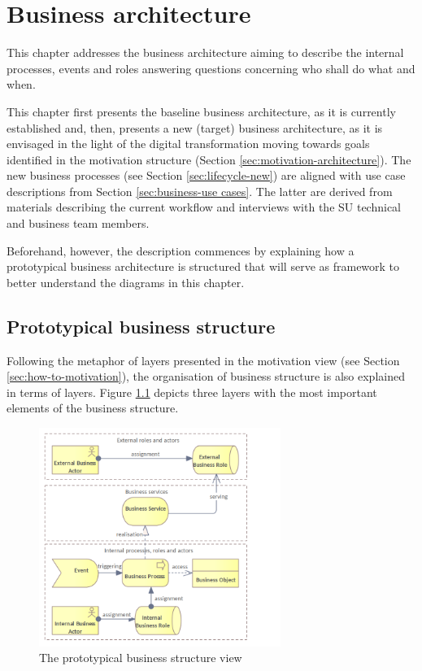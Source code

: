 \chapter{Business architecture}
\label{sec:business-architecture}
	
	This chapter addresses the business architecture aiming to describe the internal processes, events and roles answering questions concerning who shall do what and when.
	
	This chapter first presents the baseline business architecture, as it is currently established and, then, presents a new (target) business architecture, as it is envisaged in the light of the digital transformation moving towards goals identified in the motivation structure (Section \ref{sec:motivation-architecture}). The new business processes (see Section \ref{sec:lifecycle-new}) are aligned with use case descriptions from Section \ref{sec:business-use cases}. The latter are derived from materials describing the current workflow and interviews with the SU technical and business team members.

	Beforehand, however, the description commences by explaining how a prototypical business architecture is structured that will serve as framework to better understand the diagrams in this chapter. 	
	
	\section{Prototypical business structure}
	
	Following the metaphor of layers presented in the motivation view (see Section \ref{sec:how-to-motivation}), the organisation of business structure is also explained in terms of layers. Figure \ref{fig:business-structure-protopypical} depicts three layers with the most important elements of the business structure. 
	
	\begin{figure}[h]
		\centering
		\includegraphics[width=0.7\textwidth]{images/views/Business view.png}
		\caption{The prototypical business structure view}
		\label{fig:business-structure-protopypical}
	\end{figure} 
	
